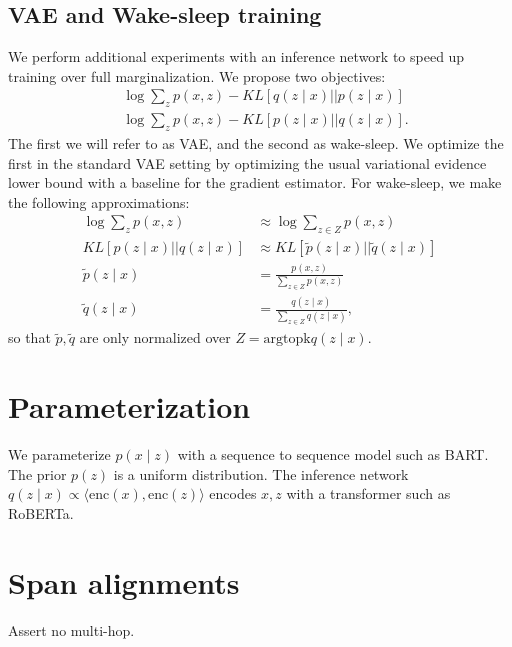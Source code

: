 \documentclass[11pt]{article}
\begin{document}
\subsection{VAE and Wake-sleep training}
We perform additional experiments with an inference network to speed up training
over full marginalization.
We propose two objectives:
\begin{align}
&\log\sum_z p(x,z) - KL[q(z\mid x) || p(z \mid x)]\\
&\log\sum_z p(x,z) - KL[p(z\mid x) || q(z \mid x)].
\end{align}
The first we will refer to as VAE, and the second as wake-sleep.
We optimize the first in the standard VAE setting by optimizing the usual variational evidence
lower bound with a baseline for the gradient estimator.
For wake-sleep, we make the following approximations:
\begin{align*}
\log\sum_z p(x,z) &\approx \log\sum_{z\in Z} p(x,z)\\
KL[p(z\mid x) || q(z \mid x)] &\approx KL[\tilde{p}(z\mid x) || \tilde{q}(z \mid x)]\\
\tilde{p}(z\mid x) &= \frac{p(x,z)}{\sum_{z \in Z} p(x,z)}\\
\tilde{q}(z\mid x) &= \frac{q(z\mid x)}{\sum_{z \in Z} q(z\mid x)},
\end{align*}
so that $\tilde{p},\tilde{q}$ are only normalized over $Z = \text{argtopk} q(z\mid x)$.

\section{Parameterization}
We parameterize $p(x\mid z)$ with a sequence to sequence model such as BART.
The prior $p(z)$ is a uniform distribution.
The inference network $q(z \mid x) \propto \langle\text{enc}(x),\text{enc}(z)\rangle$
encodes $x,z$ with a transformer such as RoBERTa.

\section{Span alignments}
Assert no multi-hop.
\end{document}
